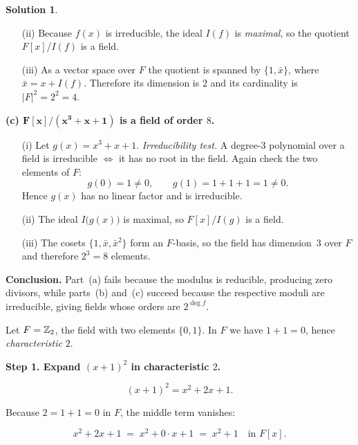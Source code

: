 \documentclass[12pt]{article}
\theoremstyle{definition} %
\newtheorem{solution}{Solution}
\theoremstyle{plain} %
\begin{document}
\begin{solution}
\begin{enumerate}
  \item[(ii)]  Because $f(x)$ is irreducible, the ideal $I(f)$ is
              \emph{maximal}, so the quotient
              $F[x]/I(f)$ is a field.

  \item[(iii)]  As a vector space over $F$ the quotient is spanned by
              $\{1,\bar{x}\}$, where $\bar{x}=x+I(f)$.
              Therefore its dimension is $2$ and its cardinality is
              $|F|^{2}=2^{2}=4$.
\end{enumerate}

\bigskip
\textbf{(c) $\boldsymbol{F[x]/(x^{3}+x+1)}$ is a field of order $8$.}

\begin{enumerate}
  \item[(i)]  Let $g(x)=x^{3}+x+1$.  
              \emph{Irreducibility test.}
              A degree-$3$ polynomial over a field is irreducible
              $\Longleftrightarrow$ it has no root in the field.
              Again check the two elements of $F$:
              \[
                 g(0)=1\neq0,\qquad g(1)=1+1+1=1\neq0.
              \]
              Hence $g(x)$ has no linear factor and is irreducible.

  \item[(ii)]  The ideal $I\bigl(g(x)\bigr)$ is maximal, so
              $F[x]/I(g)$ is a field.

  \item[(iii)]  The cosets $\{1,\bar{x},\bar{x}^{2}\}$ form an $F$-basis,
              so the field has dimension~$3$ over $F$ and therefore
              $2^{3}=8$ elements.
\end{enumerate}

\bigskip
\textbf{Conclusion.}  Part~(a) fails because the modulus is reducible,
producing zero divisors, while parts~(b) and~(c) succeed because the
respective moduli are irreducible, giving fields whose orders are
$2^{\deg f}$.
\end{solution}

Let $F=\Bbb Z_{2}$, the field with two elements $\{0,1\}$.
In $F$ we have $1+1=0$, hence \emph{characteristic} $2$.

\bigskip
\textbf{Step 1.  Expand $(x+1)^{2}$ in characteristic $2$.}

\[
(x+1)^{2}=x^{2}+2x+1.
\]

Because $2=1+1=0$ in $F$, the middle term vanishes:

\[
x^{2}+2x+1 \;=\; x^{2}+0\cdot x+1 \;=\; x^{2}+1
\quad\text{in }F[x].
\]
\end{document}
